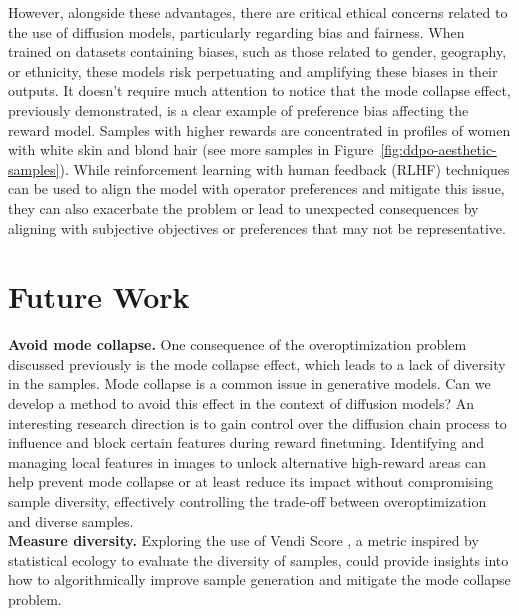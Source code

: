 \noindent However, alongside these advantages, there are critical ethical concerns related to the use of diffusion models, particularly regarding bias and fairness. When trained on datasets containing biases, such as those related to gender, geography, or ethnicity, these models risk perpetuating and amplifying these biases in their outputs. It doesn’t require much attention to notice that the mode collapse effect, previously demonstrated, is a clear example of preference bias affecting the reward model. Samples with higher rewards are concentrated in profiles of women with white skin and blond hair (see more samples in Figure~\ref{fig:ddpo-aesthetic-samples}). While reinforcement learning with human feedback (RLHF) techniques can be used to align the model with operator preferences and mitigate this issue, they can also exacerbate the problem or lead to unexpected consequences by aligning with subjective objectives or preferences that may not be representative. \\

\section{Future Work}

\noindent \textbf{Avoid mode collapse.} One consequence of the overoptimization problem discussed previously is the mode collapse effect, which leads to a lack of diversity in the samples. Mode collapse is a common issue in generative models. Can we develop a method to avoid this effect in the context of diffusion models? An interesting research direction is to gain control over the diffusion chain process to influence and block certain features during reward finetuning. Identifying and managing local features in images to unlock alternative high-reward areas can help prevent mode collapse or at least reduce its impact without compromising sample diversity, effectively controlling the trade-off between overoptimization and diverse samples. \\

\noindent \textbf{Measure diversity.} Exploring the use of Vendi Score \cite{friedman2023vendiscorediversityevaluation, pasarkar2024cousinsvendiscorefamily}, a metric inspired by statistical ecology to evaluate the diversity of samples, could provide insights into how to algorithmically improve sample generation \cite{hemmat2024improvinggeodiversitygeneratedimages} and mitigate the mode collapse problem. \\


